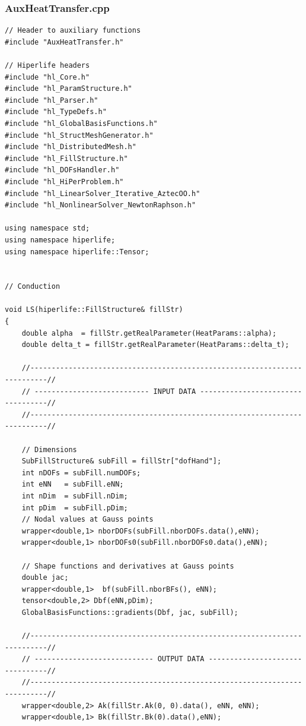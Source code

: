 \documentclass[]{article}
\begin{document}
\subsubsection{AuxHeatTransfer.cpp} \label{sec: a.cpp}
\begin{lstlisting}
// Header to auxiliary functions
#include "AuxHeatTransfer.h"
	
// Hiperlife headers
#include "hl_Core.h"
#include "hl_ParamStructure.h"
#include "hl_Parser.h"
#include "hl_TypeDefs.h"
#include "hl_GlobalBasisFunctions.h"                             
#include "hl_StructMeshGenerator.h"
#include "hl_DistributedMesh.h"                                           
#include "hl_FillStructure.h"                                             
#include "hl_DOFsHandler.h"          
#include "hl_HiPerProblem.h"         
#include "hl_LinearSolver_Iterative_AztecOO.h"
#include "hl_NonlinearSolver_NewtonRaphson.h"
	
using namespace std;
using namespace hiperlife;
using namespace hiperlife::Tensor;
	
	
// Conduction
	
void LS(hiperlife::FillStructure& fillStr)
{
	double alpha  = fillStr.getRealParameter(HeatParams::alpha);
	double delta_t = fillStr.getRealParameter(HeatParams::delta_t);
		
	//--------------------------------------------------------------------------//
	// --------------------------- INPUT DATA ----------------------------------//
	//--------------------------------------------------------------------------//
		
	// Dimensions
	SubFillStructure& subFill = fillStr["dofHand"];
	int nDOFs = subFill.numDOFs;                                        
	int eNN   = subFill.eNN;                                           
	int nDim  = subFill.nDim;                                        
	int pDim  = subFill.pDim;
	// Nodal values at Gauss points
	wrapper<double,1> nborDOFs(subFill.nborDOFs.data(),eNN);
	wrapper<double,1> nborDOFs0(subFill.nborDOFs0.data(),eNN);
		
	// Shape functions and derivatives at Gauss points
	double jac; 
	wrapper<double,1>  bf(subFill.nborBFs(), eNN);
	tensor<double,2> Dbf(eNN,pDim); 
	GlobalBasisFunctions::gradients(Dbf, jac, subFill);
		
	//--------------------------------------------------------------------------//
	// ---------------------------- OUTPUT DATA --------------------------------//
	//--------------------------------------------------------------------------//
	wrapper<double,2> Ak(fillStr.Ak(0, 0).data(), eNN, eNN);
	wrapper<double,1> Bk(fillStr.Bk(0).data(),eNN);
		

\end{lstlisting}
\end{document}
